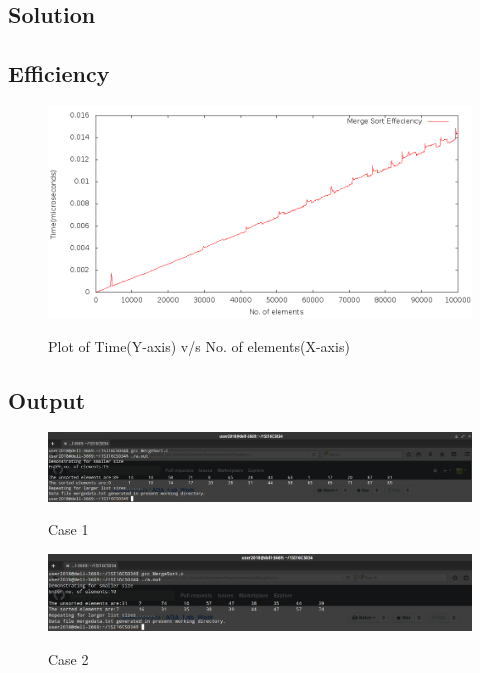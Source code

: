 \documentclass[12pt, a4paper]{article}
\begin{document}
\subsection*{Solution}

\subsection*{Efficiency}
\begin{figure}[h]
\centering
\includegraphics[width=5 in]{./Performance_graphs/mergeplot.png}
\label{Figure 1}
\caption{Plot of Time(Y-axis) v/s No. of elements(X-axis)}
\end{figure}
\newpage
\subsection*{Output}
\begin{figure}[h]
\centering
\includegraphics[width=5.2 in,height=2.5 in]{./Output/im5.png}
\label{Figure 2}
\caption{Case 1}
\end{figure}
\begin{figure}[h]
\centering
\includegraphics[width=5.2 in,height=2.5 in]{./Output/im6.png}
\label{Figure 3}
\caption{Case 2}
\end{figure}
\newpage
\end{document}
